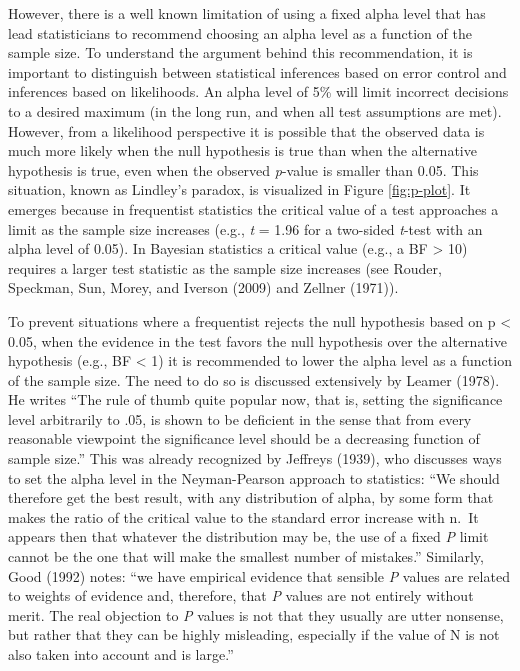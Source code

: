 \documentclass[
  english,
  ,jou, a4paper,floatsintext]{apa6}
\begin{document}
However, there is a well known limitation of using a fixed alpha level that has lead statisticians to recommend choosing an alpha level as a function of the sample size. To understand the argument behind this recommendation, it is important to distinguish between statistical inferences based on error control and inferences based on likelihoods. An alpha level of 5\% will limit incorrect decisions to a desired maximum (in the long run, and when all test assumptions are met). However, from a likelihood perspective it is possible that the observed data is much more likely when the null hypothesis is true than when the alternative hypothesis is true, even when the observed \emph{p}-value is smaller than 0.05. This situation, known as Lindley's paradox, is visualized in Figure \ref{fig:p-plot}. It emerges because in frequentist statistics the critical value of a test approaches a limit as the sample size increases (e.g., \emph{t} = 1.96 for a two-sided \emph{t}-test with an alpha level of 0.05). In Bayesian statistics a critical value (e.g., a BF \textgreater{} 10) requires a larger test statistic as the sample size increases (see Rouder, Speckman, Sun, Morey, and Iverson (2009) and Zellner (1971)).

To prevent situations where a frequentist rejects the null hypothesis based on p \textless{} 0.05, when the evidence in the test favors the null hypothesis over the alternative hypothesis (e.g., BF \textless{} 1) it is recommended to lower the alpha level as a function of the sample size. The need to do so is discussed extensively by Leamer (1978). He writes ``The rule of thumb quite popular now, that is, setting the significance level arbitrarily to .05, is shown to be deficient in the sense that from every reasonable viewpoint the significance level should be a decreasing function of sample size.'' This was already recognized by Jeffreys (1939), who discusses ways to set the alpha level in the Neyman-Pearson approach to statistics: ``We should therefore get the best result, with any distribution of alpha, by some form that makes the ratio of the critical value to the standard error increase with n.~It appears then that whatever the distribution may be, the use of a fixed \emph{P} limit cannot be the one that will make the smallest number of mistakes.'' Similarly, Good (1992) notes: ``we have empirical evidence that sensible \emph{P} values are related to weights of evidence and, therefore, that \emph{P} values are not entirely without merit. The real objection to \emph{P} values is not that they usually are utter nonsense, but rather that they can be highly misleading, especially if the value of N is not also taken into account and is large.''
\end{document}
